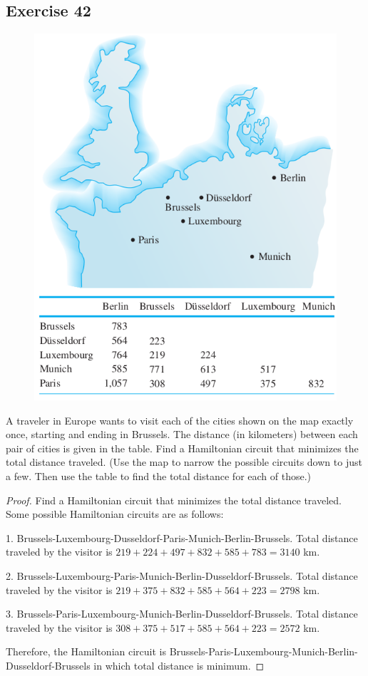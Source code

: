 \documentclass[14pt]{extarticle}
\begin{document}
\subsection{Exercise 42}
\begin{figure}[ht!]
\centering
\includegraphics[scale=0.5]{../images/10.1.42.png}
\end{figure}

A traveler in Europe wants to visit each of the cities shown on the map exactly once, starting and ending in Brussels. The 
distance (in kilometers) between each pair of cities is given in the table. Find a Hamiltonian circuit that minimizes the 
total distance traveled. (Use the map to narrow the possible circuits down to just a few. Then use the table to find the 
total distance for each of those.)

\begin{proof}
Find a Hamiltonian circuit that minimizes the total distance traveled. Some possible Hamiltonian circuits are as follows:

1. Brussels-Luxembourg-Dusseldorf-Paris-Munich-Berlin-Brussels. Total distance traveled by the visitor is \(219 + 
224 + 497 + 832 + 585 + 783 = 3140\) km.

2. Brussels-Luxembourg-Paris-Munich-Berlin-Dusseldorf-Brussels. Total distance traveled by the visitor is \(219 + 
375 + 832 + 585 + 564 + 223 = 2798\) km.

3. Brussels-Paris-Luxembourg-Munich-Berlin-Dusseldorf-Brussels. Total distance traveled by the visitor is \(308 + 
375 + 517 + 585 + 564 + 223 = 2572\) km.

Therefore, the Hamiltonian circuit is Brussels-Paris-Luxembourg-Munich-Berlin- \\ Dusseldorf-Brussels in which 
total distance is minimum.
\end{proof}
\end{document}

